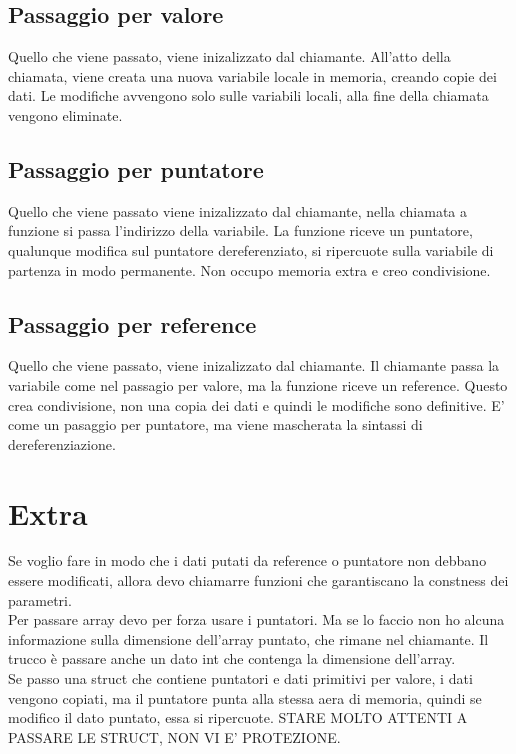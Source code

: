 \subsection{Passaggio per valore}
Quello che viene passato, viene inizalizzato dal chiamante.
All'atto della chiamata, viene creata una nuova variabile locale in memoria, creando copie dei dati. Le modifiche avvengono solo sulle variabili locali, alla fine della chiamata vengono eliminate.

\subsection{Passaggio per puntatore}
Quello che viene passato viene inizalizzato dal chiamante, nella chiamata a funzione si passa l'indirizzo della variabile.
La funzione riceve un puntatore, qualunque modifica sul puntatore dereferenziato, si ripercuote sulla variabile di partenza in modo permanente. Non occupo memoria extra e creo condivisione.

\subsection{Passaggio per reference}
Quello che viene passato, viene inizalizzato dal chiamante. Il chiamante passa la variabile come nel passagio per valore, ma la funzione riceve un reference. Questo crea condivisione, non una copia dei dati e quindi le modifiche sono definitive. E' come un pasaggio per puntatore, ma viene mascherata la sintassi di dereferenziazione.

\section{Extra}
Se voglio fare in modo che i dati putati da reference o puntatore non debbano essere modificati, allora devo chiamarre funzioni che garantiscano la constness dei parametri.\\
Per passare array devo per forza usare i puntatori. Ma se lo faccio non ho alcuna informazione sulla dimensione dell'array puntato, che rimane nel chiamante. Il trucco è passare anche un dato int che contenga la dimensione dell'array.\\
Se passo una struct che contiene puntatori e dati primitivi per valore, i dati vengono copiati, ma il puntatore punta alla stessa aera di memoria, quindi se modifico il dato puntato, essa si ripercuote. STARE MOLTO ATTENTI A PASSARE LE STRUCT, NON VI E' PROTEZIONE.\\

